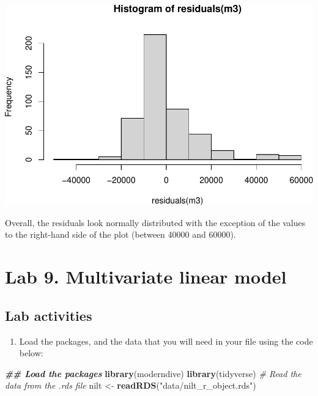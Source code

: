 \documentclass[
]{book}
\newenvironment{Shaded}{\begin{snugshade}}{\end{snugshade}}
\newcommand{\CommentTok}[1]{\textcolor[rgb]{0.56,0.35,0.01}{\textit{#1}}}
\newcommand{\DocumentationTok}[1]{\textcolor[rgb]{0.56,0.35,0.01}{\textbf{\textit{#1}}}}
\newcommand{\FunctionTok}[1]{\textcolor[rgb]{0.13,0.29,0.53}{\textbf{#1}}}
\newcommand{\NormalTok}[1]{#1}
\newcommand{\OtherTok}[1]{\textcolor[rgb]{0.56,0.35,0.01}{#1}}
\newcommand{\StringTok}[1]{\textcolor[rgb]{0.31,0.60,0.02}{#1}}
\providecommand{\tightlist}{%
  \setlength{\itemsep}{0pt}\setlength{\parskip}{0pt}}
\begin{document}
\begin{flushleft}\includegraphics[width=1\linewidth]{lab-workbook_files/figure-latex/unnamed-chunk-141-1} \end{flushleft}

Overall, the residuals look normally distributed with the exception of the values to the right-hand side of the plot (between 40000 and 60000).

\hypertarget{lab-9.-multivariate-linear-model}{%
\section{Lab 9. Multivariate linear model}\label{lab-9.-multivariate-linear-model}}

\hypertarget{lab-activities-3}{%
\subsection{Lab activities}\label{lab-activities-3}}

\begin{enumerate}
\def\labelenumi{\arabic{enumi}.}
\tightlist
\item
  Load the packages, and the data that you will need in your file using the code below:
\end{enumerate}

\begin{Shaded}
\begin{Highlighting}[]
\DocumentationTok{\#\# Load the packages}
\FunctionTok{library}\NormalTok{(moderndive)}
\FunctionTok{library}\NormalTok{(tidyverse)}
\CommentTok{\# Read the data from the .rds file}
\NormalTok{nilt }\OtherTok{\textless{}{-}} \FunctionTok{readRDS}\NormalTok{(}\StringTok{"data/nilt\_r\_object.rds"}\NormalTok{)}
\end{Highlighting}
\end{Shaded}
\end{document}
